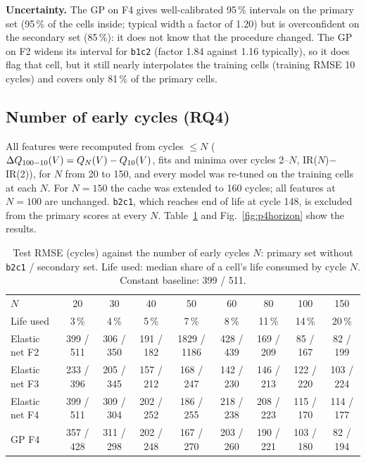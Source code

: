 \textbf{Uncertainty.} The GP on F4 gives well-calibrated 95\,\% intervals on
the primary set (95\,\% of the cells inside; typical width a factor of 1.20)
but is overconfident on the secondary set (85\,\%): it does not know that the
procedure changed. The GP on F2 widens its interval for \texttt{b1c2}
(factor 1.84 against 1.16 typically), so it does flag that cell, but it still
nearly interpolates the training cells (training RMSE 10 cycles) and covers
only 81\,\% of the primary cells.

\subsection{Number of early cycles (RQ4)}
All features were recomputed from cycles $\le N$ ($\Delta Q_{100-10}(V)=Q_N(V)-Q_{10}(V)$,
fits and minima over cycles 2--$N$, IR($N$)$-$IR(2)), for $N$ from 20 to 150,
and every model was re-tuned on the training cells at each $N$. For $N=150$
the cache was extended to 160 cycles; all features at $N=100$ are unchanged.
\texttt{b2c1}, which reaches end of life at cycle 148, is excluded from the
primary scores at every $N$. Table~\ref{tab:p4horizon} and
Fig.~\ref{fig:p4horizon} show the results.

\begin{table}[t]
\centering
\caption{Test RMSE (cycles) against the number of early cycles $N$:
primary set without \texttt{b2c1} / secondary set. Life used: median share of
a cell's life consumed by cycle $N$. Constant baseline: 399 / 511.}
\label{tab:p4horizon}
\begin{tabular}{@{}lcccccccc@{}}
\toprule
$N$ & 20 & 30 & 40 & 50 & 60 & 80 & 100 & 150 \\
Life used & 3\,\% & 4\,\% & 5\,\% & 7\,\% & 8\,\% & 11\,\% & 14\,\% & 20\,\% \\
\midrule
Elastic net F2 & 399 / 511 & 306 / 350 & 191 / 182 & 1829 / 1186 & 428 / 439 & 169 / 209 & 85 / 167 & 82 / 199 \\
Elastic net F3 & 233 / 396 & 205 / 345 & 157 / 212 & 168 / 247 & 142 / 230 & 146 / 213 & 122 / 220 & 103 / 224 \\
Elastic net F4 & 399 / 511 & 309 / 304 & 202 / 252 & 186 / 255 & 218 / 238 & 208 / 223 & 115 / 170 & 114 / 177 \\
GP F4 & 357 / 428 & 311 / 298 & 202 / 248 & 167 / 270 & 203 / 260 & 190 / 221 & 103 / 180 & 82 / 194 \\
\bottomrule
\end{tabular}
\end{table}

